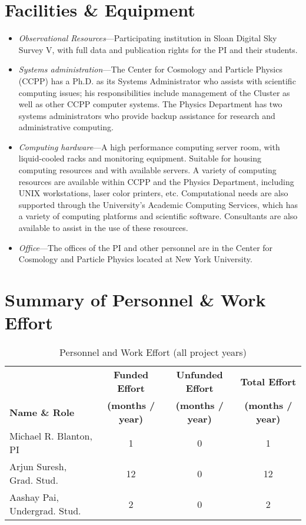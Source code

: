 \documentclass[12pt, preprint]{hacked-aastex}
\begin{document}
\section{Facilities \& Equipment}\label{sec:facilities}

\begin{itemize}
\item{\textit{Observational Resources}---Participating institution in Sloan Digital Sky Survey V, with full data and publication rights for the PI and their students.}
\item{\textit{Systems administration}---The Center for Cosmology and Particle Physics (CCPP) has a Ph.D. as its Systems Administrator who assists with scientific computing issues; his responsibilities include management of the Cluster as well as other CCPP computer systems. The Physics Department has two systems administrators who provide backup assistance for research and administrative computing.}
\item{\textit{Computing hardware}---A high performance computing server room, with liquid-cooled racks and monitoring equipment. Suitable for housing computing resources and with available
servers.
A variety of computing resources are available within CCPP and the Physics Department, including UNIX workstations, laser color printers, etc. Computational needs are also supported through the University's Academic Computing Services, which has a variety of computing platforms and scientific software. Consultants are also available to assist in the use of these resources.}
\item{\textit{Office}---The offices of the PI and other personnel are in the Center for Cosmology and Particle Physics located at New York University.}
\end{itemize}

\clearpage
\section{Summary of Personnel \& Work Effort}\label{sec:effort}

\begin{table}[h!]
\centering
\caption{Personnel and Work Effort (all project years)\label{table:effort}} 
\begin{tabular}{lccc}
\\
\hline
& {\bf Funded Effort} & {\bf Unfunded Effort} & {\bf Total Effort} \\
{\bf Name \& Role} & {\bf (months / year)} & {\bf (months / year)} 
& {\bf (months / year)} \\
\hline
\hline
Michael R. Blanton, PI & 1 & 0 & 1 \\
Arjun Suresh, Grad. Stud. & 12 & 0 & 12 \\
Aashay Pai, Undergrad. Stud. & 2 & 0 & 2 \\
\hline
\end{tabular}
\end{table}
\end{document}

